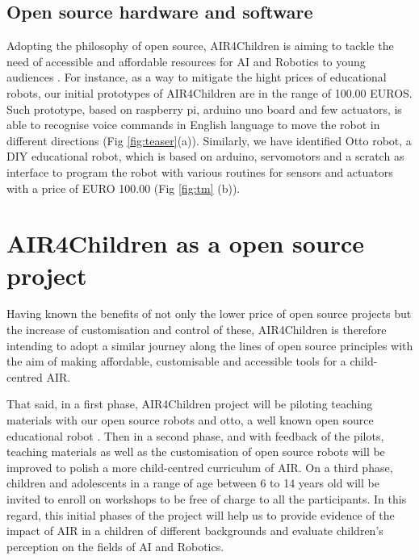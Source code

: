 \documentclass[sigconf]{acmart}
\begin{document}
\subsection{Open source hardware and software}
Adopting the philosophy of open source, AIR4Children is aiming to tackle the need of accessible and affordable resources for AI and Robotics to young audiences \cite{UNICEF2020}.
For instance, as a way to mitigate the hight prices of educational robots, our initial prototypes of AIR4Children are in the range of 100.00 EUROS. 
Such prototype, based on raspberry pi, arduino uno board and few actuators, is able to recognise voice commands in English language to move the robot in different directions (Fig \ref{fig:teaser}(a)).
Similarly, we have identified Otto robot, a DIY educational robot, which is based on arduino, servomotors and a scratch as interface to program the robot with various routines for sensors and actuators with a price of EURO 100.00 (Fig \ref{fig:tm} (b)). 

\section{AIR4Children as a open source project}
Having known the benefits of not only the lower price of open source projects but the increase of customisation and control of these, AIR4Children is therefore intending to adopt a similar journey along the lines of open source principles with the aim of making affordable, customisable and accessible tools for a child-centred AIR.

That said, in a first phase, AIR4Children project will be piloting teaching materials with our open source robots and otto, a well known open source educational robot \cite{OttoDIY:2016}.  
Then in a second phase, and with feedback of the pilots, teaching materials as well as the customisation of open source robots will be improved to polish a more child-centred curriculum of AIR. 
On a third phase, children and adolescents in a range of age between 6 to 14 years old will be invited to enroll on workshops to be free of charge to all the participants. 
In this regard, this initial phases of the project will help us to provide evidence of the impact of AIR in a children of different backgrounds and evaluate children's perception on the fields of AI and Robotics.  

\end{document}
